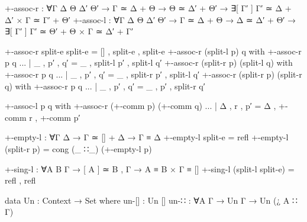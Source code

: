 \begin{code}
+-assoc-r  : ∀{Γ Δ Θ Δ′ Θ′} → Γ ≃ Δ + Θ → Θ ≃ Δ′ + Θ′ →
             ∃[ Γ′ ] Γ′ ≃ Δ + Δ′ × Γ ≃ Γ′ + Θ′
+-assoc-l  : ∀{Γ Δ Θ Δ′ Θ′} → Γ ≃ Δ + Θ → Δ ≃ Δ′ + Θ′ →
             ∃[ Γ′ ] Γ′ ≃ Θ′ + Θ × Γ ≃ Δ′ + Γ′
\end{code}
\begin{code}[hide]
+-assoc-r split-e split-e = [] , split-e , split-e
+-assoc-r (split-l p) q with +-assoc-r p q
... | _ , p′ , q′ = _ , split-l p′ , split-l q′
+-assoc-r (split-r p) (split-l q) with +-assoc-r p q
... | _ , p′ , q′ = _ , split-r p′ , split-l q′
+-assoc-r (split-r p) (split-r q) with +-assoc-r p q
... | _ , p′ , q′ = _ , p′ , split-r q′

+-assoc-l p q with +-assoc-r (+-comm p) (+-comm q)
... | Δ , r , p′ = Δ , +-comm r , +-comm p′

+-empty-l : ∀{Γ Δ} → Γ ≃ [] + Δ → Γ ≡ Δ
+-empty-l split-e = refl
+-empty-l (split-r p) = cong (_ ∷_) (+-empty-l p)

+-sing-l : ∀{A B Γ} → [ A ] ≃ B , Γ → A ≡ B × Γ ≡ []
+-sing-l (split-l split-e) = refl , refl

data Un : Context → Set where
  un-[]  : Un []
  un-∷   : ∀{A Γ} → Un Γ → Un (¿ A ∷ Γ)
\end{code}
